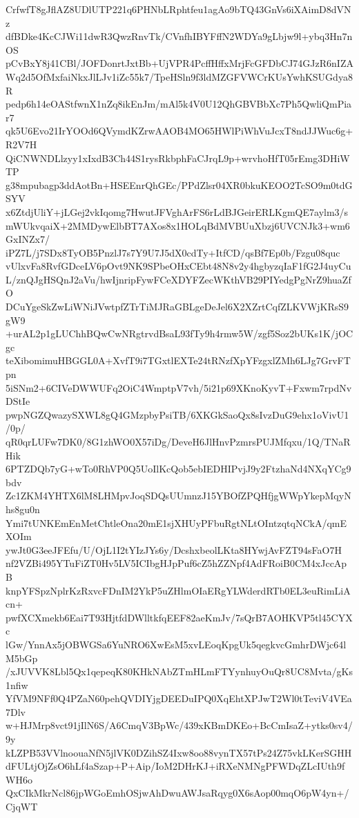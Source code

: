 CrfwfT8gJflAZ8UDlUTP221q6PHNbLRphtfeu1agAo9bTQ43GnVs6iXAimD8dVNz
dfBDke4KcCJWi11dwR3QwzRnvTk/CVnfhIBYFffN2WDYa9gLbjw9l+ybq3Hn7nOS
pCvBxY8j41CBl/JOFDonrtJxtBb+UjVPR4PcffHffxMrjFcGFDbCJ74GJzR6nIZA
Wq2d5OfMxfaiNkxJlLJv1iZc55k7/TpeHSln9f3ldMZGFVWCrKUsYwhKSUGdya8R
pedp6h14eOAStfwnX1nZq8ikEnJm/mAl5k4V0U12QhGBVBbXc7Ph5QwliQmPiar7
qk5U6Evo21IrYOOd6QVymdKZrwAAOB4MO65HWlPiWhVuJcxT8ndJJWuc6g+R2V7H
QiCNWNDLlzyy1xIxdB3Ch44S1rysRkbphFaCJrqL9p+wrvhoHfT05rEmg3DHiWTP
g38mpubagp3ddAotBn+HSEEnrQhGEc/PPdZlsr04XR0bkuKEOO2TcSO9m0tdGSYV
x6ZtdjUliY+jLGej2vkIqomg7HwutJFVghArFS6rLdBJGeirERLKgmQE7aylm3/s
mWUkvqaiX+2MMDywElbBT7AXos8x1HOLqBdMVBUuXbzj6UVCNJk3+wm6GxINZx7/
iPZ7L/j7SDx8TyOB5PnzlJ7s7Y9U7J5dX0cdTy+ItfCD/qsBf7Ep0b/Fzgu08quc
vUlxvFa8RvfGDceLV6pOvt9NK9SPbeOHxCEbt48N8v2y4hgbyzqIaF1fG2J4uyCu
L/znQJgHSQnJ2aVu/hwIjnripFywFCeXDYFZecWKthVB29PIYedgPgNrZ9huaZfO
DCuYgeSkZwLiWNiJVwtpfZTrTiMJRaGBLgeDeJel6X2XZrtCqfZLKVWjKRsS9gW9
+urAL2p1gLUChhBQwCwNRgtrvdBsaL93fTy9h4rmw5W/zgf5Soz2bUKs1K/jOCgc
teXibomimuHBGGL0A+XvfT9i7TGxtlEXTe24tRNzfXpYFzgxlZMh6LJg7GrvFTpn
5iSNm2+6CIVeDWWUFq2OiC4WmptpV7vh/5i21p69XKnoKyvT+Fxwm7rpdNvDStIe
pwpNGZQwazySXWL8gQ4GMzpbyPsiTB/6XKGkSaoQx8sIvzDuG9ehx1oVivU1/0p/
qR0qrLUFw7DK0/8G1zhWO0X57iDg/DeveH6JlHnvPzmrsPUJMfqxu/1Q/TNaRHik
6PTZDQb7yG+wTo0RhVP0Q5UoIlKcQob5ebIEDHIPvjJ9y2FtzhaNd4NXqYCg9bdv
Zc1ZKM4YHTX6lM8LHMpvJoqSDQsUUmnzJ15YBOfZPQHfjgWWpYkepMqyNhs8gu0n
Ymi7tUNKEmEnMetChtleOna20mE1sjXHUyPFbuRgtNLtOIntzqtqNCkA/qmEXOIm
ywJt0G3eeJFEfu/U/OjL1I2tYIzJYs6y/DcshxbeolLKta8HYwjAvFZT94sFaO7H
nf2VZBi495YTuFiZT0Hv5LV5ICIbgHJpPuf6cZ5hZZNpf4AdFRoiB0CM4xJccApB
knpYFSpzNplrKzRxvcFDnIM2YkP5uZHlmOIaERgYLWderdRTb0EL3euRimLiAcn+
pwfXCXmekb6Eai7T93HjtfdDWlltkfqEEF82aeKmJv/7sQrB7AOHKVP5tl45CYXc
lGw/YnnAx5jOBWGSa6YuNRO6XwEsM5xvLEoqKpgUk5qegkvcGmhrDWjc64lM5bGp
/xJUVVK8Lbl5Qx1qepeqK80KHkNAbZTmHLmFTYynhuyOuQr8UC8Mvta/gKs1nfiw
YfVM9NFf0Q4PZaN60pehQVDIYjgDEEDuIPQ0XqEhtXPJwT2Wl0tTeviV4VEa7Dlv
w+HJMrp8vct91jIlN6S/A6CmqV3BpWc/439xKBmDKEo+BcCmIsaZ+ytks0sv4/9y
kLZPB53VVlnoouaNfN5jlVK0DZihSZ4Ixw8oo88vynTX57tPs24Z75vkLKerSGHH
dFULtjOjZsO6hLf4aSzap+P+Aip/IoM2DHrKJ+iRXeNMNgPFWDqZLcIUth9fWH6o
QxCIkMkrNcl86jpWGoEmhOSjwAhDwuAWJsaRqyg0X6sAop00mqO6pW4yn+/CjqWT
